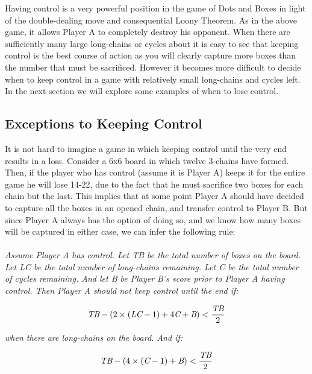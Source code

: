 \documentclass[12pt,twoside]{reedthesis}
\begin{document}
Having control is a very powerful position in the game of Dots and Boxes in light of the double-dealing move and consequential Loony Theorem.  As in the above game, it allows Player A to completely destroy his opponent.  When there are sufficiently many large long-chains or cycles about it is easy to see that keeping control is the best course of action as you will clearly capture more boxes than the number that must be sacrificed.  However it becomes more difficult to decide when to keep control in a game with relatively small long-chains and cycles left.  In the next section we will explore some examples of when to lose control.

\subsection{Exceptions to Keeping Control}
It is not hard to imagine a game in which keeping control until the very end results in a loss.  Consider a 6x6 board in which twelve 3-chains have formed.  Then, if the player who has control (assume it is Player A) keeps it for the entire game he will lose 14-22, due to the fact that he must sacrifice two boxes for each chain but the last.  This implies that at some point Player A should have decided to capture all the boxes in an opened chain, and transfer control to Player B.  But since Player A always has the option of doing so, and we know how many boxes will be captured in either case, we can infer the following rule:
\\\\
\emph{Assume Player A has control.  Let TB be the total number of boxes on the board. Let LC be the total number of long-chains remaining. Let C be the total number of cycles remaining.  And let B be Player B's score prior to Player A having control.  Then Player A should not keep control until the end if:}

\begin{equation}
\emph{TB} - (2 \times (\emph{LC} - 1) + 4\emph{C} + \emph{B}) < \frac{\emph{TB}}{2}
\end{equation}

\noindent
\emph{when there are long-chains on the board. And if:}

\begin{equation}
\emph{TB} - (4 \times (\emph{C} - 1) + \emph{B}) < \frac{\emph{TB}}{2}
\end{equation}
\end{document}
